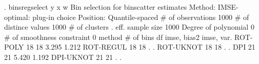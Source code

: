 . binsregselect y x w
{\smallskip}
{\smallskip}
Bin selection for binscatter estimates
Method: IMSE-optimal: plug-in choice
Position: Quantile-spaced
{\smallskip}
          \# of observations {\VBAR}    1000
       \# of distince values {\VBAR}    1000
              \# of clusters {\VBAR}       .
           eff. sample size {\VBAR}    1000
       Degree of polynomial {\VBAR}       0
 \# of smoothness constraint {\VBAR}       0
{\smallskip}
    method    {\VBAR}  \# of bins {\VBAR}     df   {\VBAR} imse, bias{\caret}2 {\VBAR}  imse, var.  
   ROT-POLY   {\VBAR}      18    {\VBAR}     18   {\VBAR}    3.295     {\VBAR}    1.212
   ROT-REGUL  {\VBAR}      18    {\VBAR}     18   {\VBAR}        .     {\VBAR}        .
   ROT-UKNOT  {\VBAR}      18    {\VBAR}     18   {\VBAR}        .     {\VBAR}        .
      DPI     {\VBAR}      21    {\VBAR}     21   {\VBAR}    5.420     {\VBAR}    1.192
   DPI-UKNOT  {\VBAR}      21    {\VBAR}     21   {\VBAR}        .     {\VBAR}        .
